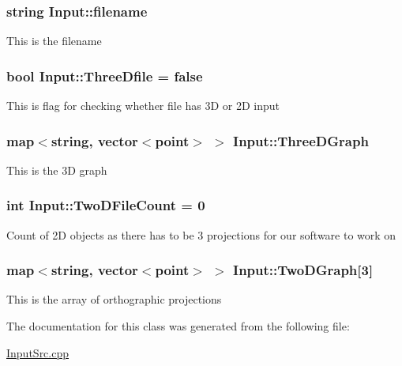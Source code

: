 \subsubsection[{\texorpdfstring{filename}{filename}}]{\setlength{\rightskip}{0pt plus 5cm}string Input\+::filename}\hypertarget{classInput_af296359065236ac9139aab7736d6844d}{}\label{classInput_af296359065236ac9139aab7736d6844d}
This is the filename 
\subsubsection[{\texorpdfstring{Three\+Dfile}{ThreeDfile}}]{\setlength{\rightskip}{0pt plus 5cm}bool Input\+::\+Three\+Dfile = false}\hypertarget{classInput_aacb0e034125e32179081a97eecab47df}{}\label{classInput_aacb0e034125e32179081a97eecab47df}
This is flag for checking whether file has 3D or 2D input 
\subsubsection[{\texorpdfstring{Three\+D\+Graph}{ThreeDGraph}}]{\setlength{\rightskip}{0pt plus 5cm}map$<$string, vector$<${\bf point}$>$ $>$ Input\+::\+Three\+D\+Graph}\hypertarget{classInput_aed882deebbb45d8423e5477e8ccaee60}{}\label{classInput_aed882deebbb45d8423e5477e8ccaee60}
This is the 3D graph 
\subsubsection[{\texorpdfstring{Two\+D\+File\+Count}{TwoDFileCount}}]{\setlength{\rightskip}{0pt plus 5cm}int Input\+::\+Two\+D\+File\+Count = 0}\hypertarget{classInput_a82141fe9142aec447f9ef52fd2f78c73}{}\label{classInput_a82141fe9142aec447f9ef52fd2f78c73}
Count of 2D objects as there has to be 3 projections for our software to work on 
\subsubsection[{\texorpdfstring{Two\+D\+Graph}{TwoDGraph}}]{\setlength{\rightskip}{0pt plus 5cm}map$<$string, vector$<${\bf point}$>$ $>$ Input\+::\+Two\+D\+Graph\mbox{[}3\mbox{]}}\hypertarget{classInput_a55526617adbcb0db4b3d565f4dbe772d}{}\label{classInput_a55526617adbcb0db4b3d565f4dbe772d}
This is the array of orthographic projections 

The documentation for this class was generated from the following file\+:\begin{DoxyCompactItemize}
\item 
\hyperlink{InputSrc_8cpp}{Input\+Src.\+cpp}\end{DoxyCompactItemize}
